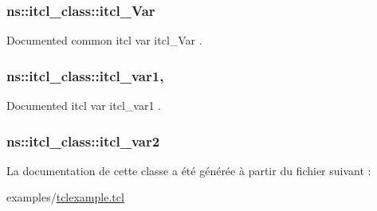 \subsubsection[{itcl\+\_\+\+Var}]{\setlength{\rightskip}{0pt plus 5cm}ns\+::itcl\+\_\+class\+::itcl\+\_\+\+Var\hspace{0.3cm}{\ttfamily [static]}}\label{classns_1_1itcl__class_a8df46696ce554fed04d170932260fbb8}
Documented common itcl var {\ttfamily itcl\+\_\+\+Var} . \hypertarget{classns_1_1itcl__class_ae515e43ca6bb755d116416f94a13d344}{}
\subsubsection[{itcl\+\_\+var1}]{\setlength{\rightskip}{0pt plus 5cm}ns\+::itcl\+\_\+class\+::itcl\+\_\+var1\hspace{0.3cm}{\ttfamily [static]}, {\ttfamily [protected]}}\label{classns_1_1itcl__class_ae515e43ca6bb755d116416f94a13d344}


Documented itcl var {\ttfamily itcl\+\_\+var1} . 

\hypertarget{classns_1_1itcl__class_abaf3c744194c1b3ae68fb0ba70d8786e}{}
\subsubsection[{itcl\+\_\+var2}]{\setlength{\rightskip}{0pt plus 5cm}ns\+::itcl\+\_\+class\+::itcl\+\_\+var2\hspace{0.3cm}{\ttfamily [static]}}\label{classns_1_1itcl__class_abaf3c744194c1b3ae68fb0ba70d8786e}


La documentation de cette classe a été générée à partir du fichier suivant \+:\begin{DoxyCompactItemize}
\item 
examples/\hyperlink{tclexample_8tcl}{tclexample.\+tcl}\end{DoxyCompactItemize}
